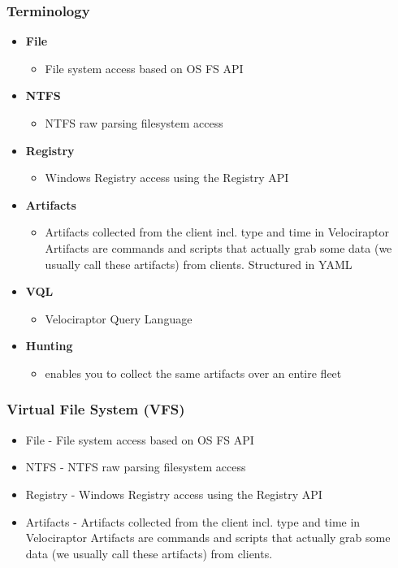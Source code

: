 \subsubsection{Terminology}
\begin{itemize}
    \item \textbf{File}
    \begin{itemize}
        \item  File system access based on OS FS API
    \end{itemize}
    \item \textbf{NTFS}
    \begin{itemize}
        \item NTFS raw parsing filesystem access
    \end{itemize}
    \item \textbf{Registry}
    \begin{itemize}
        \item Windows Registry access using the Registry API
    \end{itemize}
    \item \textbf{Artifacts}
    \begin{itemize}
        \item Artifacts collected from the client incl. type and time in Velociraptor Artifacts are commands and scripts that actually grab some data (we usually call these artifacts) from clients. Structured in YAML
    \end{itemize}
    \item \textbf{VQL}
    \begin{itemize}
        \item Velociraptor Query Language
    \end{itemize}
    \item \textbf{Hunting}
    \begin{itemize}
        \item enables you to collect the same artifacts over an entire fleet
    \end{itemize}
\end{itemize}

\subsubsection{Virtual File System (VFS)}
\begin{itemize}
    \item File - File system access based on OS FS API
    \item NTFS - NTFS raw parsing filesystem access
    \item Registry - Windows Registry access using the Registry API
    \item Artifacts - Artifacts collected from the client incl. type and time
    in Velociraptor Artifacts are commands and scripts that actually
    grab some data (we usually call these artifacts) from clients.
\end{itemize}


